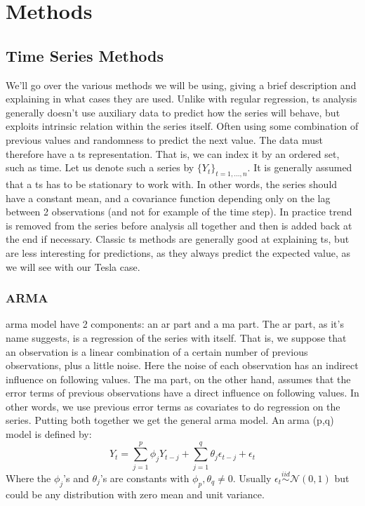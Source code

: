 \chapter{Methods}

\section{Time Series Methods}
We'll go over the various methods we will be using, giving a brief description and explaining in what cases they are used.
Unlike with regular regression, \acrlong{ts} analysis generally doesn't use auxiliary data to predict how the series will behave, but exploits intrinsic relation within the series itself. Often using some combination of previous values and randomness to predict the next value.
The data must therefore have a \acrlong{ts} representation. That is, we can index it by an ordered set, such as time.
Let us denote such a series by $\{Y_t\}_{t=1,\dots,n}$.
It is generally assumed that a \acrlong{ts} has to be stationary to work with. In other words, the series should have a constant mean, and a covariance function depending only on the lag between 2 observations (and not for example of the time step). In practice trend is removed from the series before analysis all together and then is added back at the end if necessary.
Classic \acrlong{ts} methods are generally good at explaining \acrshort{ts}, but are less interesting for predictions, as they always predict the expected value, as we will see with our Tesla case.


\subsection{ARMA}
\acrfull{arma} model have 2 components: an \acrfull{ar} part and a \acrfull{ma} part. 
The \acrshort{ar} part, as it's name suggests, is a regression of the series with itself. That is, we suppose that an observation is a linear combination of a certain number of previous observations, plus a little noise. Here the noise of each observation has an indirect influence on following values.
The \acrshort{ma} part, on the other hand, assumes that the error terms of previous observations have a direct influence on following values. In other words, we use previous error terms as covariates to do regression on the series.
Putting both together we get the general \acrshort{arma} model.
An \acrshort{arma} (p,q) model is defined by:
$$
Y_t = \sum_{j=1}^p \phi_j Y_{t-j} + \sum_{j=1}^q \theta_j \epsilon_{t-j} + \epsilon_t
$$
Where the $\phi_j$'s and $\theta_j$'s are constants with $\phi_p , \theta_q \neq 0$. Usually $\epsilon_t \stackrel{iid}{\sim} \mathcal{N}(0,1)$ but could be any distribution with zero mean and unit variance.

